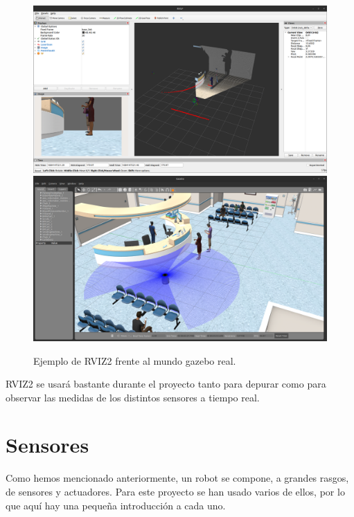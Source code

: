 \begin{figure} [H]
    \begin{center}
        \includegraphics[width=13cm]{figs/c3/RVIZ2.png}
        \includegraphics[width=13cm]{figs/c3/Gazebo_RVIZ.png}
    \end{center}
    \caption[RVIZ2 Vs mundo gazebo]{Ejemplo de RVIZ2 frente al mundo gazebo real.}
    \label{fig:rviz2_example}
\end{figure}

RVIZ2 se usará bastante durante el proyecto tanto para depurar como para observar las medidas de los distintos sensores a tiempo real.

\newpage

\section{Sensores}
\label{sec:sensores}

Como hemos mencionado anteriormente, un robot se compone, a grandes rasgos, de sensores y actuadores. Para este proyecto se han usado varios de ellos,
por lo que aquí hay una pequeña introducción a cada uno.

